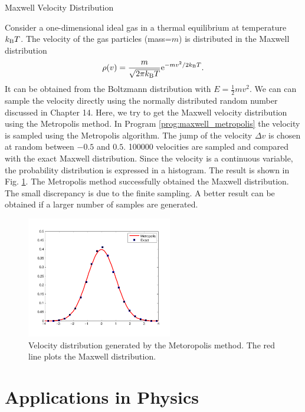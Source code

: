 \bigskip


\bigskip
\begin{example}{Maxwell Velocity Distribution}

\medskip
\noindent
Consider a one-dimensional ideal gas in a thermal equilibrium at temperature $k_\text{B} T$.  The velocity of the gas particles (mass=$m$) is distributed in the Maxwell distribution
\begin{equation}
\rho(v)= 
\frac{m}{\sqrt{2\pi k_\text{B} T}} \text{e}^{-m v^2/2 k_\text{B} T}.
\end{equation}
It can be obtained from the Boltzmann distribution with  $E=\frac{1}{2} m v^2$. We can can sample the velocity 
directly using the normally distributed random number discussed in Chapter 14.  Here, we try to get the Maxwell velocity distribution using the Metropolis method.  In Program \ref{prog:maxwell_metropolis} the velocity is sampled using the Metropolis algorithm.  The jump of the velocity $\Delta v$ is chosen at random between $-0.5$ and $0.5$. 100000 velocities are sampled and compared with the exact Maxwell distribution.  Since the velocity is a continuous variable, the probability distribution is expressed in a histogram.
The result is shown in Fig. \ref{fig:maxwell_metropolis}. The Metropolis method successfully obtained the Maxwell distribution.  The small discrepancy is due to the finite sampling.  A better result can be obtained if a larger number of samples are generated.

\begin{figure}
\centering
\includegraphics[width=2.5in]{17.Metropolis/maxwell_metropolis.pdf}
\caption{Velocity distribution generated by the Metoropolis method.  The red line plots the Maxwell distribution.}
\label{fig:maxwell_metropolis}
\end{figure}
\end{example}

\noindent
\section{Applications in Physics}


